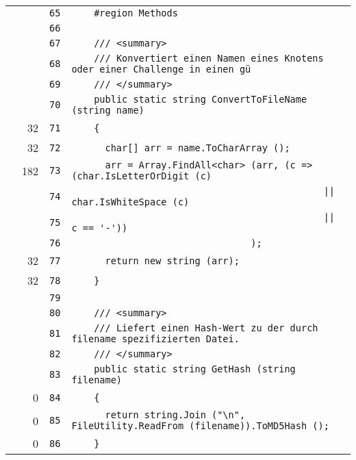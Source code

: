 \documentclass[a4paper,10pt]{article}
\begin{document}
\begin{longtable}[l]{lrrl}
\cellcolor{gray} &  & \verb~65~ & \verb~    #region Methods~\\
\cellcolor{gray} &  & \verb~66~ & \verb~~\\
\cellcolor{gray} &  & \verb~67~ & \verb~    /// <summary>~\\
\cellcolor{gray} &  & \verb~68~ & \verb~    /// Konvertiert einen Namen eines Knotens oder einer Challenge in einen gü~\\
\cellcolor{gray} &  & \verb~69~ & \verb~    /// </summary>~\\
\cellcolor{gray} &  & \verb~70~ & \verb~    public static string ConvertToFileName (string name)~\\
\cellcolor{green} & 32 & \verb~71~ & \verb~    {~\\
\cellcolor{green} & 32 & \verb~72~ & \verb~      char[] arr = name.ToCharArray ();~\\
\cellcolor{green} & 182 & \verb~73~ & \verb~      arr = Array.FindAll<char> (arr, (c => (char.IsLetterOrDigit (c)~\\
\cellcolor{gray} &  & \verb~74~ & \verb~                                             || char.IsWhiteSpace (c)~\\
\cellcolor{gray} &  & \verb~75~ & \verb~                                             || c == '-'))~\\
\cellcolor{gray} &  & \verb~76~ & \verb~                                );~\\
\cellcolor{green} & 32 & \verb~77~ & \verb~      return new string (arr);~\\
\cellcolor{green} & 32 & \verb~78~ & \verb~    }~\\
\cellcolor{gray} &  & \verb~79~ & \verb~~\\
\cellcolor{gray} &  & \verb~80~ & \verb~    /// <summary>~\\
\cellcolor{gray} &  & \verb~81~ & \verb~    /// Liefert einen Hash-Wert zu der durch filename spezifizierten Datei.~\\
\cellcolor{gray} &  & \verb~82~ & \verb~    /// </summary>~\\
\cellcolor{gray} &  & \verb~83~ & \verb~    public static string GetHash (string filename)~\\
\cellcolor{red} & 0 & \verb~84~ & \verb~    {~\\
\cellcolor{red} & 0 & \verb~85~ & \verb~      return string.Join ("\n", FileUtility.ReadFrom (filename)).ToMD5Hash ();~\\
\cellcolor{red} & 0 & \verb~86~ & \verb~    }~\\

\end{longtable}
\end{document}
